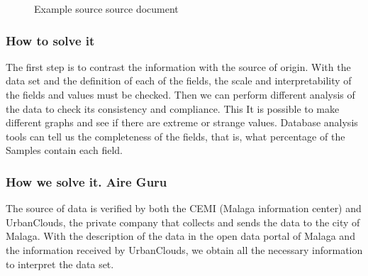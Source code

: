 \begin{figure}[ht]
\centering
{}
\caption{Example source source document}
\end{figure}

\subsubsection{How to solve it} 
The first step is to contrast the information with the source of origin. With the data set and the definition
of each of the fields, the scale and interpretability of the fields and values must be checked.
Then we can perform different analysis of the data to check its consistency and compliance. This
It is possible to make different graphs and see if there are extreme or strange values.
Database analysis tools can tell us the completeness of the fields, that is, what percentage of the
Samples contain each field.

\subsubsection{How we solve it. Aire Guru} 
The source of data is verified by both the CEMI (Malaga information center) and UrbanClouds, the private company
that collects and sends the data to the city of Malaga.
With the description of the data in the open data portal of Malaga and the information received by UrbanClouds,
we obtain all the necessary information to interpret the data set. \\

